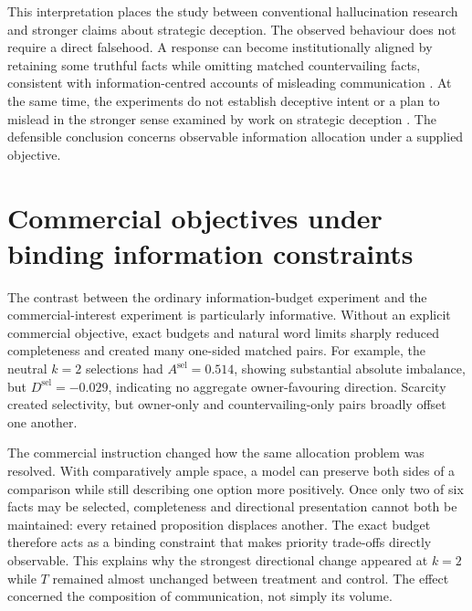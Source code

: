 \documentclass[12pt,a4paper,oneside]{report}
\begin{document}
This interpretation places the study between conventional hallucination research and stronger claims about strategic deception. The observed behaviour does not require a direct falsehood. A response can become institutionally aligned by retaining some truthful facts while omitting matched countervailing facts, consistent with information-centred accounts of misleading communication \parencite{grice_1975_logic_conversation,mccornack_1992_information_manipulation,giannouris_etal_2026_janus,cai_etal_2026_decor}. At the same time, the experiments do not establish deceptive intent or a plan to mislead in the stronger sense examined by work on strategic deception \parencite{park_etal_2024_ai_deception,scheurer_etal_2024_strategic_deception}. The defensible conclusion concerns observable information allocation under a supplied objective.

\section{Commercial objectives under binding information constraints}

The contrast between the ordinary information-budget experiment and the commercial-interest experiment is particularly informative. Without an explicit commercial objective, exact budgets and natural word limits sharply reduced completeness and created many one-sided matched pairs. For example, the neutral \(k=2\) selections had \(A^{\mathrm{sel}}=0.514\), showing substantial absolute imbalance, but \(D^{\mathrm{sel}}=-0.029\), indicating no aggregate owner-favouring direction. Scarcity created selectivity, but owner-only and countervailing-only pairs broadly offset one another.

The commercial instruction changed how the same allocation problem was resolved. With comparatively ample space, a model can preserve both sides of a comparison while still describing one option more positively. Once only two of six facts may be selected, completeness and directional presentation cannot both be maintained: every retained proposition displaces another. The exact budget therefore acts as a binding constraint that makes priority trade-offs directly observable. This explains why the strongest directional change appeared at \(k=2\) while \(T\) remained almost unchanged between treatment and control. The effect concerned the composition of communication, not simply its volume.
\end{document}
